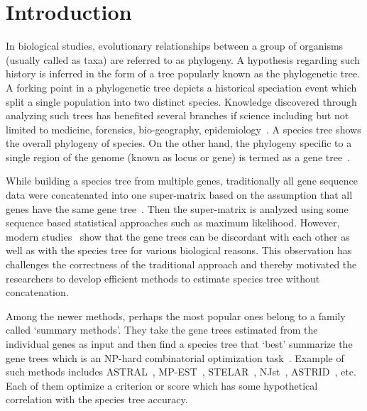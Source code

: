 \section{Introduction}
\label{sec:intro}
In biological studies, evolutionary relationships between a group of organisms (usually called as taxa) are referred to as phylogeny. A hypothesis regarding such history is inferred in the form of a tree popularly known as the phylogenetic tree. A forking point in a phylogenetic tree depicts a historical speciation event which split a single population into two distinct species.  Knowledge discovered through analyzing such trees has benefited several branches if science including but not limited to medicine, forensics, bio-geography, epidemiology~\cite{felix2015phylogenetics}. 
A species tree shows the overall phylogeny of species. On the other hand, the phylogeny specific to a single region of the genome (known as locus or gene) is termed as a gene tree~\cite{maddison1997gene}. 

While building a species tree from multiple genes, traditionally all gene sequence data were concatenated into one super-matrix based on the assumption that all genes have the same gene tree~\cite{huelsenbeck1996combining, de2007supermatrix}. Then the super-matrix is analyzed using some sequence based statistical approaches such as maximum likelihood. However, modern studies~\cite{zwickl2014disentangling, jarvis2014whole} show that the gene trees can be discordant with each other as well as with the species tree for various biological reasons. This observation has challenges the correctness of the traditional approach and thereby motivated the researchers to develop efficient methods to estimate species tree without concatenation. 

Among the newer methods, perhaps the most popular ones belong to a family called `summary methods'. They take the gene trees estimated from the individual genes as input and then find a species tree that `best' summarize the gene trees which is an NP-hard combinatorial optimization task~\cite{mirarab2014astral}. Example of such methods includes ASTRAL~\cite{mirarab2014astral}, MP-EST~\cite{liu2010maximum}, STELAR~\cite{islam2019stelar}, NJst~\cite{liu2011estimating}, ASTRID~\cite{vachaspati2015astrid}, etc. Each of them optimize a criterion or score which has some hypothetical correlation with the species tree accuracy. 

